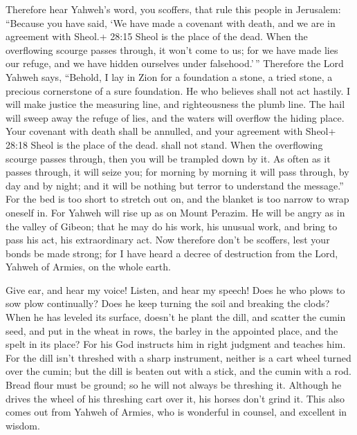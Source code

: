  Therefore hear Yahweh's word, you scoffers, that rule this
people in Jerusalem:  ``Because you have said, `We have
made a covenant with death, and we are in agreement with Sheol.+ 28:15
Sheol is the place of the dead. When the overflowing scourge passes
through, it won't come to us; for we have made lies our refuge, and we
have hidden ourselves under falsehood.'\,''  Therefore the
Lord Yahweh says, ``Behold, I lay in Zion for a foundation a stone, a
tried stone, a precious cornerstone of a sure foundation. He who
believes shall not act hastily.  I will make justice the
measuring line, and righteousness the plumb line. The hail will sweep
away the refuge of lies, and the waters will overflow the hiding place.
 Your covenant with death shall be annulled, and your
agreement with Sheol+ 28:18 Sheol is the place of the dead. shall not
stand. When the overflowing scourge passes through, then you will be
trampled down by it.  As often as it passes through, it
will seize you; for morning by morning it will pass through, by day and
by night; and it will be nothing but terror to understand the message.''
 For the bed is too short to stretch out on, and the
blanket is too narrow to wrap oneself in.  For Yahweh will
rise up as on Mount Perazim. He will be angry as in the valley of
Gibeon; that he may do his work, his unusual work, and bring to pass his
act, his extraordinary act.  Now therefore don't be
scoffers, lest your bonds be made strong; for I have heard a decree of
destruction from the Lord, Yahweh of Armies, on the whole earth.

 Give ear, and hear my voice! Listen, and hear my speech!
 Does he who plows to sow plow continually? Does he keep
turning the soil and breaking the clods?  When he has
leveled its surface, doesn't he plant the dill, and scatter the cumin
seed, and put in the wheat in rows, the barley in the appointed place,
and the spelt in its place?  For his God instructs him in
right judgment and teaches him.  For the dill isn't
threshed with a sharp instrument, neither is a cart wheel turned over
the cumin; but the dill is beaten out with a stick, and the cumin with a
rod.  Bread flour must be ground; so he will not always be
threshing it. Although he drives the wheel of his threshing cart over
it, his horses don't grind it.  This also comes out from
Yahweh of Armies, who is wonderful in counsel, and excellent in wisdom.

